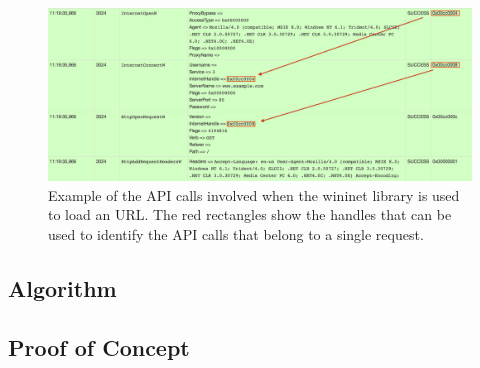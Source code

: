\thispagestyle{empty}
\begin{figure}[h!]
    \centering
    \includegraphics[width=14.7cm]{Images/wininet.png}
    \caption{Example of the API calls involved when the wininet library is used to load an URL. The red rectangles show the handles that can be used to identify the API calls that belong to a single request.}
    \label{fig:wininet}
\end{figure}
\restoregeometry

\subsection{Algorithm}


\subsection{Proof of Concept}

